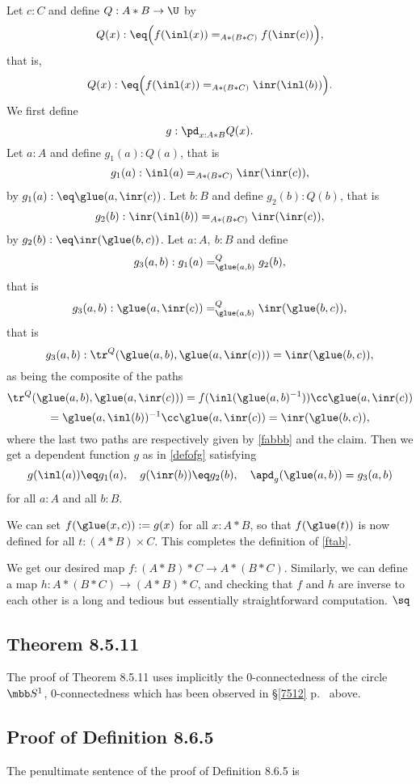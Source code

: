 \documentclass[12pt]{article}
\begin{document}
Let $c:C$ and define $Q:A*B\to\U$ by 
$$
Q(x):\eq\Big(f(\inl(x))=_{A*(B*C)}f(\inr(c))\Big),
$$ 
that is,
$$
Q(x):\eq\Big(f(\inl(x))=_{A*(B*C)}\inr(\inl(b))\Big).
$$
We first define 
\begin{equation}\label{defofg}
g:\pd_{x:A*B}Q(x).
\end{equation}
Let $a:A$ and define $g_1(a):Q(a)$, that is
$$
g_1(a):\inl(a)=_{A*(B*C)}\inr(\inr(c)),
$$ 
by $g_1(a):\eq\glue(a,\inr(c))$. Let $b:B$ and define $g_2(b):Q(b)$, that is
$$
g_2(b):\inr(\inl(b))=_{A*(B*C)}\inr(\inr(c)),
$$ 
by $g_2(b):\eq\inr(\glue(b,c))$. Let $a\!:\!A,\ b\!:\!B$ and define 
$$
g_3(a,b):g_1(a)=^Q_{\glue(a,b)}g_2(b),
$$ 
that is 
$$
g_3(a,b):\glue(a,\inr(c))=^Q_{\glue(a,b)}\inr(\glue(b,c)),
$$ 
that is 
$$
g_3(a,b):\tr^Q(\glue(a,b),\glue(a,\inr(c)))=\inr(\glue(b,c)),
$$ 
as being the composite of the paths 
$$
\tr^Q(\glue(a,b),\glue(a,\inr(c)))=f(\inl(\glue(a,b)^{-1}))\cc\glue(a,\inr(c))
$$ 
$$
=\glue(a,\inl(b))^{-1}\cc\glue(a,\inr(c))=\inr(\glue(b,c)),
$$ 
where the last two paths are respectively given by \eqref{fabbb} and the claim. Then we get a dependent function $g$ as in \eqref{defofg} satisfying 
$$
g(\inl(a))\eq g_1(a),\quad g(\inr(b))\eq g_2(b),\quad \apd_g(\glue(a,b))=g_3(a,b)
$$ 
for all $a:A$ and all $b:B$. 

We can set $f(\glue(x,c)):=g(x)$ for all $x:A*B$, so that $f(\glue(t))$ is now defined for all $t:(A*B)\times C$. This completes the definition of \eqref{ftab}.

We get our desired map $f:(A*B)*C\to A*(B*C)$. Similarly, we can define a map $h:A*(B*C)\to(A*B)*C$, and checking that $f$ and $h$ are inverse to each other is a long and tedious but essentially straightforward computation. $\sq$


\subsection{Theorem 8.5.11}%

The proof of Theorem 8.5.11 uses implicitly the 0-connectedness of the circle $\mbb S^1$, 0-connectedness which has been observed in \S\ref{7512} p.~\pageref{7512} above.


\subsection{Proof of Definition 8.6.5}%

The penultimate sentence of the proof of Definition 8.6.5 is
\end{document}
